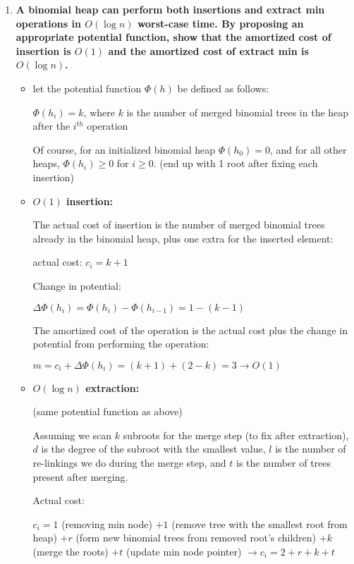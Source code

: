 \documentclass[12pt]{article}
\begin{document}
\begin{enumerate}
\begin{enumerate}
    \end{enumerate}

    \item \textbf{A binomial heap can perform both insertions and extract min operations in $O(\log n)$ 
    worst-case time. By proposing an appropriate potential function, show that the amortized 
    cost of insertion is $O(1)$ and the amortized cost of extract min is $O(\log n)$.}

    \begin{itemize}
        \item let the potential function $\Phi(h)$ be defined as follows:
        
        $\Phi(h_i) = k$, where $k$ is the number of merged binomial trees in the heap after 
        the $i^{th}$ operation

        Of course, for an initialized binomial heap $\Phi(h_0) = 0$, and for all other heaps, $\Phi(h_i) \geq 0$ for $i \geq 0$. 
        (end up with 1 root after fixing each insertion)

        \item \textbf{$O(1)$ insertion:}
        
        The actual cost of insertion is the number of merged binomial trees already in the binomial heap, plus one 
        extra for the inserted element:

        actual cost: $c_i = k + 1$

        Change in potential:

        $\Delta \Phi(h_i) = \Phi(h_i) - \Phi(h_{i - 1}) = 1 - (k - 1)$

        The amortized cost of the operation is the actual cost plus the change in potential from performing the 
        operation:

        $m = c_i + \Delta \Phi(h_i) = (k + 1) + (2 - k) = 3 \longrightarrow O(1)$

        \item \textbf{$O(\log n)$ extraction:}
        
        (same potential function as above)

        Assuming we scan $k$ subroots for the merge step (to fix after extraction), $d$ is the degree of the subroot 
        with the smallest value, $l$ is the number of re-linkings we do during the merge step, and $t$ is the number of 
        trees present after merging.

        Actual cost: 

        $c_i = 1$ (removing min node) $ + 1$ (remove tree with the smallest root from heap) $ + r$ (form new binomial trees 
        from removed root's children) $ + k$ (merge the roots) $ + t$ (update min node pointer) 
        $\longrightarrow c_i = 2 + r + k + t$


\end{itemize}
\end{enumerate}
\end{document}
